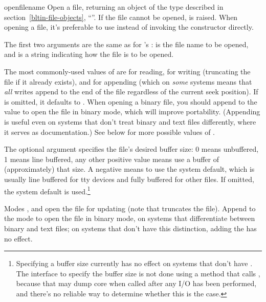 \begin{funcdesc}{open}{filename}
  Open a file, returning an object of the  type described
  in section~\ref{bltin-file-objects}, ``''.  If the file cannot be opened,
   is raised.  When opening a file, it's
  preferable to use  instead of invoking the
   constructor directly.

  The first two arguments are the same as for 's
  :  is the file name to be opened,
  and  is a string indicating how the file is to be opened.

  The most commonly-used values of  are  for
  reading,  for writing (truncating the file if it already
  exists), and  for appending (which on \emph{some} \UNIX{}
  systems means that \emph{all} writes append to the end of the file
  regardless of the current seek position).  If  is omitted,
  it defaults to .  When opening a binary file, you should
  append  to the  value to open the file in binary
  mode, which will improve portability.  (Appending  is
  useful even on systems that don't treat binary and text files
  differently, where it serves as documentation.)  See below for more
  possible values of .

  The optional  argument specifies the
  file's desired buffer size: 0 means unbuffered, 1 means line
  buffered, any other positive value means use a buffer of
  (approximately) that size.  A negative  means to use
  the system default, which is usually line buffered for tty
  devices and fully buffered for other files.  If omitted, the system
  default is used.\footnote{
    Specifying a buffer size currently has no effect on systems that
    don't have .  The interface to specify the
    buffer size is not done using a method that calls
    , because that may dump core when called
    after any I/O has been performed, and there's no reliable way to
    determine whether this is the case.}

  Modes ,  and  open the file for
  updating (note that  truncates the file).  Append
   to the mode to open the file in binary mode, on systems
  that differentiate between binary and text files; on systems
  that don't have this distinction, adding the  has no effect.
  

\end{funcdesc}
